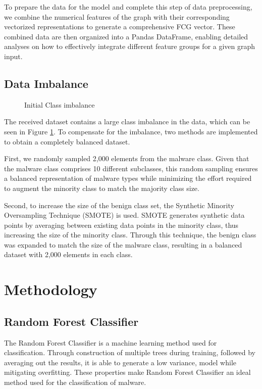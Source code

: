 \documentclass[11pt]{article}
\begin{document}
To prepare the data for the model and complete this step of data preprocessing, we combine the numerical features of the graph with their corresponding vectorized representations to generate a comprehensive FCG vector. These combined data are then organized into a Pandas DataFrame, enabling detailed analyses on how to effectively integrate different feature groups for a given graph input.

\subsection{Data Imbalance}

\begin{figure}[h!]
    \centering
    
    \caption{Initial Class imbalance}
    \label{fig:class_imbalance}
\end{figure}

The received dataset contains a large class imbalance in the data, which can be seen in Figure \ref{fig:class_imbalance}. To compensate for the imbalance, two methods are implemented to obtain a completely balanced dataset.

First, we randomly sampled 2,000 elements from the malware class. Given that the malware class comprises 10 different subclasses, this random sampling ensures a balanced representation of malware types while minimizing the effort required to augment the minority class to match the majority class size.

Second, to increase the size of the benign class set, the Synthetic Minority Oversampling Technique (SMOTE) is used. SMOTE generates synthetic data points by averaging between existing data points in the minority class, thus increasing the size of the minority class. Through this technique, the benign class was expanded to match the size of the malware class, resulting in a balanced dataset with 2,000 elements in each class.

\section{Methodology}


\subsection{Random Forest Classifier}
The Random Forest Classifier is a machine learning method used for classification. Through construction of multiple trees during training, followed by averaging out the results, it is able to generate a low variance, model while mitigating overfitting. These properties make Random Forest Classifier an ideal method used for the classification of malware.
\end{document}
